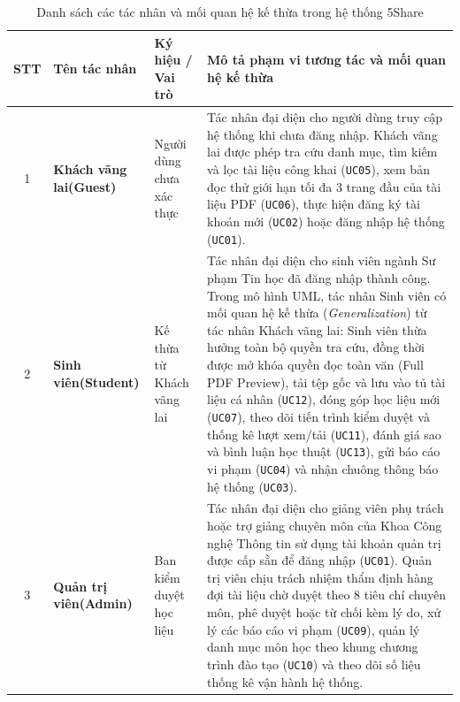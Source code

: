 \begin{table}[H]
\centering
\footnotesize\linespread{1.05}\selectfont
\setlength{\tabcolsep}{5pt}
\renewcommand{\arraystretch}{1.12}
\begin{tabularx}{\textwidth}{|c|p{2.8cm}|p{2.8cm}|X|}
\hline
\rowcolor[HTML]{EAEAEA}
\textbf{STT} & \textbf{Tên tác nhân} & \textbf{Ký hiệu / Vai trò} & \textbf{Mô tả phạm vi tương tác và mối quan hệ kế thừa} \\
\hline
1 & \textbf{Khách vãng lai\newline(Guest)} & Người dùng chưa xác thực & Tác nhân đại diện cho người dùng truy cập hệ thống khi chưa đăng nhập. Khách vãng lai được phép tra cứu danh mục, tìm kiếm và lọc tài liệu công khai (\texttt{UC05}), xem bản đọc thử giới hạn tối đa 3 trang đầu của tài liệu PDF (\texttt{UC06}), thực hiện đăng ký tài khoản mới (\texttt{UC02}) hoặc đăng nhập hệ thống (\texttt{UC01}). \\
\hline
2 & \textbf{Sinh viên\newline(Student)} & Kế thừa từ Khách vãng lai & Tác nhân đại diện cho sinh viên ngành Sư phạm Tin học đã đăng nhập thành công. Trong mô hình UML, tác nhân Sinh viên có mối quan hệ kế thừa (\textit{Generalization}) từ tác nhân Khách vãng lai: Sinh viên thừa hưởng toàn bộ quyền tra cứu, đồng thời được mở khóa quyền đọc toàn văn (Full PDF Preview), tải tệp gốc và lưu vào tủ tài liệu cá nhân (\texttt{UC12}), đóng góp học liệu mới (\texttt{UC07}), theo dõi tiến trình kiểm duyệt và thống kê lượt xem/tải (\texttt{UC11}), đánh giá sao và bình luận học thuật (\texttt{UC13}), gửi báo cáo vi phạm (\texttt{UC04}) và nhận chuông thông báo hệ thống (\texttt{UC03}). \\
\hline
3 & \textbf{Quản trị viên\newline(Admin)} & Ban kiểm duyệt học liệu & Tác nhân đại diện cho giảng viên phụ trách hoặc trợ giảng chuyên môn của Khoa Công nghệ Thông tin sử dụng tài khoản quản trị được cấp sẵn để đăng nhập (\texttt{UC01}). Quản trị viên chịu trách nhiệm thẩm định hàng đợi tài liệu chờ duyệt theo 8 tiêu chí chuyên môn, phê duyệt hoặc từ chối kèm lý do, xử lý các báo cáo vi phạm (\texttt{UC09}), quản lý danh mục môn học theo khung chương trình đào tạo (\texttt{UC10}) và theo dõi số liệu thống kê vận hành hệ thống. \\
\hline
\end{tabularx}
\caption{Danh sách các tác nhân và mối quan hệ kế thừa trong hệ thống 5Share}
\label{tab:actors_c2}
\end{table}

